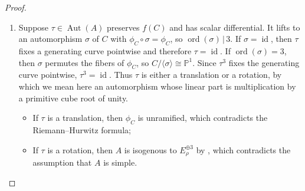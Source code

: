 \documentclass{amsart}
\DeclareMathOperator{\Aut}{Aut}
\DeclareMathOperator{\ord}{ord}
\DeclareMathOperator{\id}{id}
\begin{document}
\begin{proof}
\begin{enumerate}
\item 
Suppose $\tau\in\Aut(A)$ preserves $f(C)$ and has scalar differential. It lifts to an
automorphism $\sigma$ of $C$ with $\phi_C\circ\sigma=\phi_C$, so $\ord(\sigma)\,|\,3$. 
If $\sigma=\id$, then $\tau$ fixes a generating curve
pointwise and therefore $\tau=\id$. If $\ord(\sigma)=3$, then $\sigma$ permutes the fibers of $\phi_C$, so
$C/\langle\sigma\rangle\cong\mathbb{P}^1$. 
Since $\tau^3$ fixes the generating curve pointwise, $\tau^3=\id$.
Thus $\tau$ is either a translation or a rotation, by which we mean here
an automorphism whose linear part is multiplication by a primitive cube
root of unity.
\begin{itemize}
	\item If $\tau$ is a translation, then $\phi_C$ is unramified, which contradicts the Riemann--Hurwitz formula;
	\item If $\tau$ is a rotation, then $A$ is isogenous to $E_{\rho}^{\oplus 3}$ by \cite[Lemma 3.15]{re_subvarieties_in_abelian_variety.pdf}, which contradicts the assumption that $A$ is simple.
\end{itemize}
\end{enumerate}
\end{proof}



\end{document}
